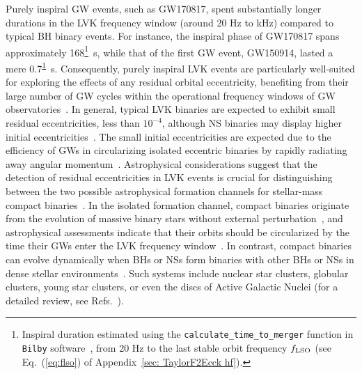 \documentclass[aps,prd,twocolumn,superscriptaddress,groupedaddress,nofootinbib,showpacs,eqsecnum,useAms]{revtex4-2}
\begin{document}
Purely inspiral GW events, such as GW170817, spent substantially longer durations in the LVK frequency window (around 20 Hz to kHz) compared to typical BH binary events. For instance, the inspiral phase of GW170817
spans approximately 168\footnote{Inspiral duration estimated using the \texttt{calculate\_time\_to\_merger} function in \texttt{Bilby} software~\cite{bilby_paper}, from 20 Hz to the last stable orbit frequency $f_{\rm LSO}$ (see Eq.~(\ref{eq:flso}) of Appendix~\ref{sec: TaylorF2Ecck hf}).\label{xx}}~s, while that of 
the first GW event, GW150914, lasted a mere 0.7\textsuperscript{\ref{xx}}~s. 
Consequently, purely inspiral LVK events are particularly well-suited for exploring the effects of any residual orbital eccentricity, benefiting from their large number of GW cycles within the operational frequency windows of GW observatories~\cite{Favata2022}.
In general, typical LVK binaries are expected to exhibit small residual eccentricities, less than $10^{-4}$, although NS binaries may display higher initial eccentricities~\cite{Kowalska11}. 
 The small initial eccentricities are expected 
due to the efficiency of GWs in circularizing isolated eccentric binaries by rapidly radiating away angular momentum~\cite{Peters64}. 
Astrophysical considerations suggest that the detection of residual eccentricities in LVK events is crucial for distinguishing between the two possible astrophysical formation channels for stellar-mass compact binaries~\cite{Zevin2021}.
 In the isolated formation channel, compact binaries originate
from the evolution of massive binary stars without external perturbation~\cite{Broekgaarden2021}, and astrophysical assessments indicate that their orbits should be circularized by the time their GWs enter the 
LVK frequency window~\cite{Belczynski16}.
In contrast, compact binaries can evolve dynamically when BHs or NSs form binaries with other BHs or NSs in dense stellar environments~\cite{Sigurdsson1993}.
% 
Such systems include nuclear star clusters, globular clusters, young star clusters, or even the discs of Active Galactic Nuclei (for a detailed review, see Refs.~\cite{Sigurdsson1993,Miller2002,Rodriguez2016b,Antonini2016a, Antonini2016b,Askar2017, Haiman2009, Bartos2017}).
\end{document}

